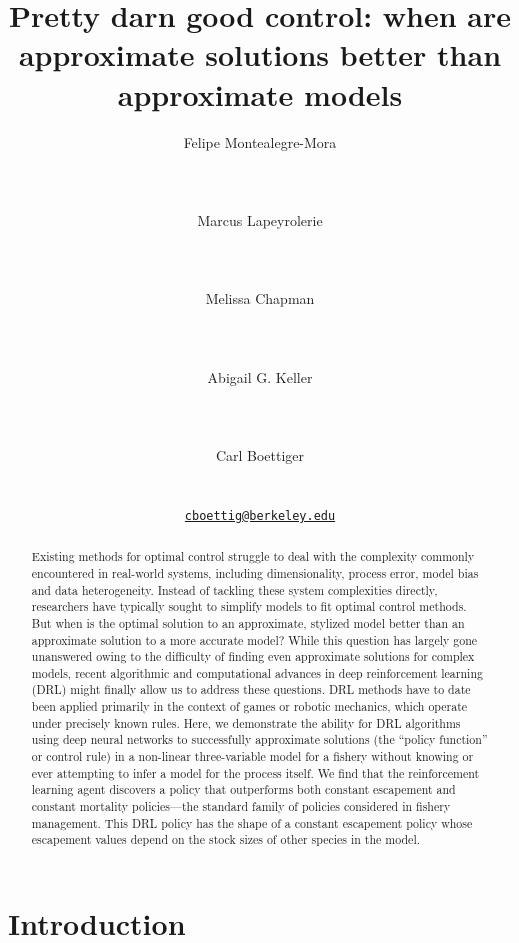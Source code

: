 \documentclass{article}
\title{Pretty darn good control: when are approximate solutions better
than approximate models}
\author{
    Felipe Montealegre-Mora
   \\
     \\
   \\
  \texttt{} \\
   \And
    Marcus Lapeyrolerie
   \\
     \\
   \\
  \texttt{} \\
   \And
    Melissa Chapman
   \\
     \\
   \\
  \texttt{} \\
   \And
    Abigail G. Keller
   \\
     \\
   \\
  \texttt{} \\
   \And
    Carl Boettiger
   \\
     \\
   \\
  \texttt{\href{mailto:cboettig@berkeley.edu}{\nolinkurl{cboettig@berkeley.edu}}} \\
  }
\begin{document}
\maketitle


\begin{abstract}
Existing methods for optimal control struggle to deal with the
complexity commonly encountered in real-world systems, including
dimensionality, process error, model bias and data heterogeneity.
Instead of tackling these system complexities directly, researchers have
typically sought to simplify models to fit optimal control methods. But
when is the optimal solution to an approximate, stylized model better
than an approximate solution to a more accurate model? While this
question has largely gone unanswered owing to the difficulty of finding
even approximate solutions for complex models, recent algorithmic and
computational advances in deep reinforcement learning (DRL) might
finally allow us to address these questions. DRL methods have to date
been applied primarily in the context of games or robotic mechanics,
which operate under precisely known rules. Here, we demonstrate the
ability for DRL algorithms using deep neural networks to successfully
approximate solutions (the ``policy function'' or control rule) in a
non-linear three-variable model for a fishery without knowing or ever
attempting to infer a model for the process itself. We find that the
reinforcement learning agent discovers a policy that outperforms both
constant escapement and constant mortality policies---the standard
family of policies considered in fishery management. This DRL policy has
the shape of a constant escapement policy whose escapement values depend
on the stock sizes of other species in the model.
\end{abstract}


\hypertarget{intro}{%
\section{Introduction}\label{intro}}
\end{document}
